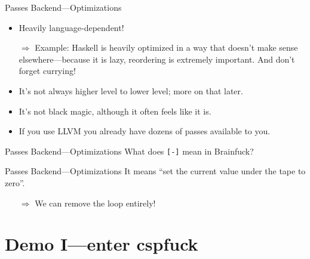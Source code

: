 \documentclass[aspectratio=169]{beamer}
\begin{document}
  \begin{frame}{Passes Backend—Optimizations}
    \begin{itemize}
      \item Heavily language-dependent!
      \item[$\Rightarrow$] Example: Haskell is heavily optimized in a way that
                           doesn’t make sense elsewhere—because it is lazy,
                           reordering is extremely important. And don’t forget
                           currying!
      \item It’s not always higher level to lower level; more on that later.
      \item It’s not black magic, although it often feels like it is.
      \item If you use LLVM you already have dozens of passes available to you.
    \end{itemize}
  \end{frame}
  \begin{frame}{Passes Backend—Optimizations}
    What does \texttt{[-]} mean in Brainfuck?
  \end{frame}
  \begin{frame}{Passes Backend—Optimizations}
    It means “set the current value under the tape to zero”.

    \begin{itemize}
      \item[$\Rightarrow$] We can remove the loop entirely!
    \end{itemize}
  \end{frame}
  \section{Demo I—enter cspfuck}
\end{document}
